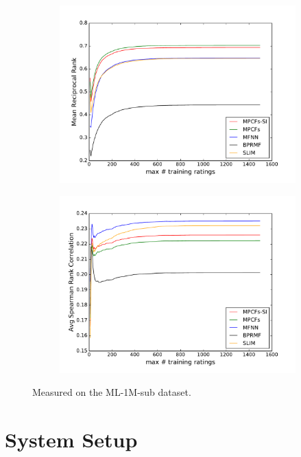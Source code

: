\begin{figure}
\begin{subfigure}[b]{0.46\linewidth}
		\includegraphics[width=\linewidth]{./section-chapter2/figures/ml-1m_comparison_mrr.pdf}
	\end{subfigure}
	\begin{subfigure}[b]{0.46\linewidth}
		\includegraphics[width=\linewidth]{./section-chapter2/figures/ml-1m_comparison_src.pdf}
	\end{subfigure}
	
	\caption{Measured on the ML-1M-sub dataset.}
	\label{f:ml-1m-comp-group}
\end{figure}
\newpage
\section{System Setup}
\label{st:system-setup} 


